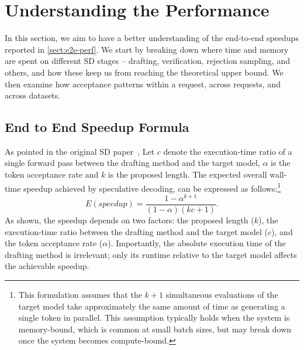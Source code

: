 \section{Understanding the Performance}
\label{sec:understand-perf}
In this section, we aim to have a better understanding of the end-to-end speedups reported in \autoref{sect:e2e-perf}. 
We start by breaking down where time and memory are spent on different SD stages -- drafting, verification, rejection sampling, and others, and how these keep us from reaching the theoretical upper bound. We then examine how acceptance patterns within a request, across requests, and across datasets. 


\subsection{End to End Speedup Formula}
As pointed in the original SD paper~\cite{leviathan2023fast},
Let $c$ denote the execution-time ratio of a single forward pass between the drafting method and the target model, $\alpha$ is the token acceptance rate and $k$ is the proposed length. The expected overall wall-time speedup achieved by speculative decoding, can be expressed as follows:\footnote{This formulation assumes that the $k + 1$ simultaneous evaluations of the target model take approximately the same amount of time as generating a single token in parallel. This assumption typically holds when the system is memory-bound, which is common at small batch sizes, but may break down once the system becomes compute-bound.}
\begin{equation}
\label{eq:speedup}
     E(speedup)=\frac{1-\alpha^{k+1}}{(1-\alpha)(kc+1)}.
\end{equation}
As shown, the speedup depends on two factors: the proposed length ($k$), the execution-time ratio between the drafting method and the target model ($c$), and the token acceptance rate ($\alpha$). Importantly, the absolute execution time of the drafting method is irrelevant; only its runtime relative to the target model affects the achievable speedup.

